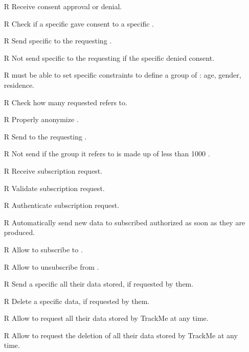 \documentclass[../../../rasd.tex]{subfiles}
\begin{document}
\begin{itemize}
            \item[R\subs{17}]Receive  consent approval or denial.
            \item[R\subs{18}]Check if a specific  gave consent to a specific .
            \item[R\subs{19}]Send specific to the requesting .
            \item[R\subs{20}]Not send specific to the requesting  if the specific  denied consent.
            \item[R\subs{21}] must be able to set specific constraints to define a group of : age, gender, residence.
            \item[R\subs{22}]Check how many  requested  refers to.
            \item[R\subs{23}]Properly anonymize .
            \item[R\subs{24}]Send  to the requesting .
            \item[R\subs{25}]Not send  if the group it refers to is made up of less than 1000 .
            \item[R\subs{26}]Receive  subscription request.
            \item[R\subs{27}]Validate  subscription request.
            \item[R\subs{28}]Authenticate  subscription request.
            \item[R\subs{29}]Automatically send new data to subscribed authorized  as soon as they are produced.
            \item[R\subs{30}]Allow  to subscribe to .
            \item[R\subs{31}]Allow  to unsubscribe from .
            \item[R\subs{32}]Send a specific  all their data stored, if requested by them.
            \item[R\subs{33}]Delete a  specific data, if requested by them.
            \item[R\subs{34}]Allow  to request all their data stored by TrackMe at any time.
            \item[R\subs{35}]Allow  to request the deletion of all their data stored by TrackMe at any time.
        \end{itemize}
\end{document}

